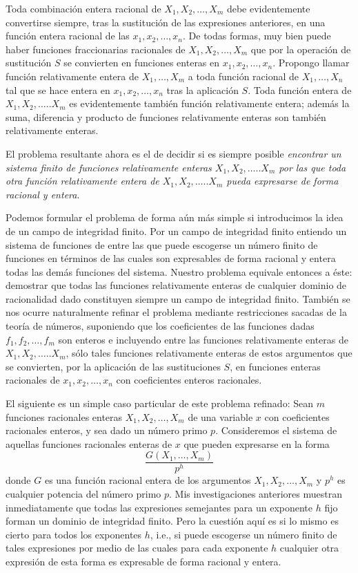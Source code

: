 \documentclass[a4paper, 12pt]{article}
\begin{document}
Toda combinación entera racional de $X_1, X_2,\dots, X_m$ debe evidentemente convertirse siempre, tras la sustitución de las expresiones anteriores, en una función entera racional de las $x_1, x_2,\dots, x_n$. De todas formas, muy bien puede haber funciones fraccionarias racionales de $X_1, X_2, \dots,X_m$ que por la operación de sustitución $S$ se convierten en funciones enteras en $x_1, x_2, \dots, x_n$. Propongo llamar función relativamente entera de $X_1,\dots, X_m$ a toda función racional de $X_1, \dots, X_n$ tal que se hace entera en $x_1, x_2, \dots, x_n$ tras la aplicación $S$. Toda función entera de $X_1, X_2, \dots..X_m$ es evidentemente también función relativamente entera; ade\-más la suma, diferencia y producto de funciones relativamente enteras son también relativamente enteras.

El problema resultante ahora es el de decidir si es siempre posible \textit{encontrar un sistema finito de funciones relativamente enteras $X_1, X_2, \dots..X_m$ por las que toda otra función relativamente entera de $X_1, X_2, \dots..X_m$ pueda expresarse de forma racional y entera}.

Podemos formular el problema de forma aún más simple si introducimos la idea de un campo de integridad finito. Por un campo de integridad finito entiendo un sistema de funciones de entre las que puede escogerse un número finito de funciones en términos de las cuales son expresables de forma racional y entera todas las demás funciones del sistema. Nuestro problema equivale entonces a éste: demostrar que todas las funciones relativamente enteras de cualquier dominio de racionalidad dado constituyen siempre un campo de integridad finito.
También se nos ocurre naturalmente refinar el problema mediante restricciones sacadas de la teoría de números, suponiendo que los coeficientes de las funciones dadas $f_1,f_2, \dots, f_m$ son enteros e incluyendo entre las funciones relativamente enteras de $X_1, X_2, \dots..X_m$, sólo tales funciones relativamente enteras de estos argumentos que se convierten, por la aplicación de las sustituciones $S$, en funciones enteras racionales de $x_1, x_2, \dots, x_n$ con coeficientes enteros racionales.

El siguiente es un simple caso particular de este problema refinado: Sean $m$ funciones racionales enteras $X_1, X_2, \dots,X_m$ de una variable $x$ con coeficientes racionales enteros, y sea dado un número primo $p$. Consideremos el sistema de aquellas funciones racionales enteras de $x$ que pueden expresarse en la forma
$$
\frac{G(X_1, \dots, X_m)}{p^h}
$$
donde $G$ es una función racional entera de los argumentos $X_1, X_2, \dots,X_m$ y $p^h$ es cualquier potencia del número primo $p$. Mis investigaciones anteriores muestran inmediatamente que todas las expresiones semejantes para un exponente $h$ fijo forman un dominio de integridad finito. Pero la cuestión aquí es si lo mismo es cierto para todos los exponentes $h$, i.e., si puede escogerse un número finito de tales expresiones por medio de las cuales para cada exponente $h$ cualquier otra expresión de esta forma es expresable de forma racional y entera.
\end{document}
